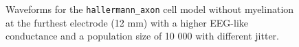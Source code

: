 \documentclass[final, a4paper,masters,en,listoffigures,listoftables,norwegiandates]{NMBU}
\begin{document}
\begin{figure}[htbp]
    \centering
    \vspace*{-3cm}
    \caption{Waveforms for the \texttt{hallermann\_axon} cell model without myelination at the furthest electrode (12 mm) with a higher EEG-like conductance and a population size of 10 000 with different jitter.} 
    \label{fig:axonjitterseeg}
\end{figure}
\end{document}
